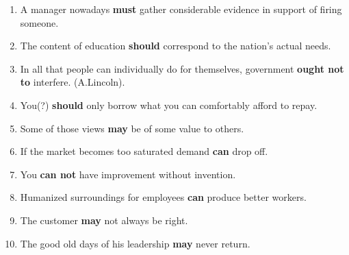 \documentclass[main.tex]{subfiles}
\begin{document}
\begin{enumerate}[nosep,leftmargin=*]
	\itemsep\eitsp
	\item A manager nowadays \textbf{must} gather considerable evidence in support of firing someone.
	\item The content of education \textbf{should} correspond to the nation's actual needs.
	\item In all that people can individually do for themselves, government \textbf{ought not to} interfere. (A.Lincoln).
	\item You(?) \textbf{should} only borrow what you can comfortably afford to repay.
	\item Some of those views \textbf{may} be of some value to others.
	\item If the market becomes too saturated demand \textbf{can} drop off.
	\item You \textbf{can not} have improvement without invention.
	\item Humanized surroundings for employees \textbf{can} produce better workers.
	\item The customer \textbf{may} not always be right.
	\item The good old days of his leadership \textbf{may} never return.
\end{enumerate}
\ 

\end{document}
